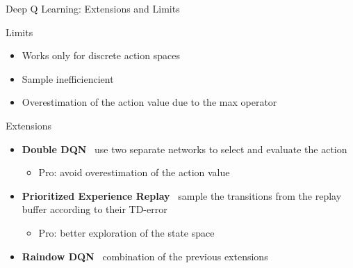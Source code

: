 \documentclass[presentation, 9pt]{beamer}\mode<presentation>{\usetheme{AMSBolognaFC}}
\begin{document}
\begin{frame}{Deep Q Learning: Extensions and Limits}
	\begin{block}{Limits}
		\begin{itemize}
			\item Works only for discrete action spaces
			\item Sample inefficiencient
			\item Overestimation of the action value due to the max operator
		\end{itemize}
	\end{block}
	\begin{block}{Extensions}
		\begin{itemize}
			\item \textbf{Double DQN} \faArrowRight \, use two separate networks to select and evaluate the action
			\begin{itemize}
				\item Pro: avoid overestimation of the action value
			\end{itemize}
			\item \textbf{Prioritized Experience Replay} \faArrowRight \, sample the transitions from the replay buffer according to their TD-error
			\begin{itemize}
				\item Pro: better exploration of the state space
			\end{itemize}
			\item \textbf{Raindow DQN} \faArrowRight \, combination of the previous extensions
		\end{itemize}
	\end{block}
\end{frame}
\end{document}

